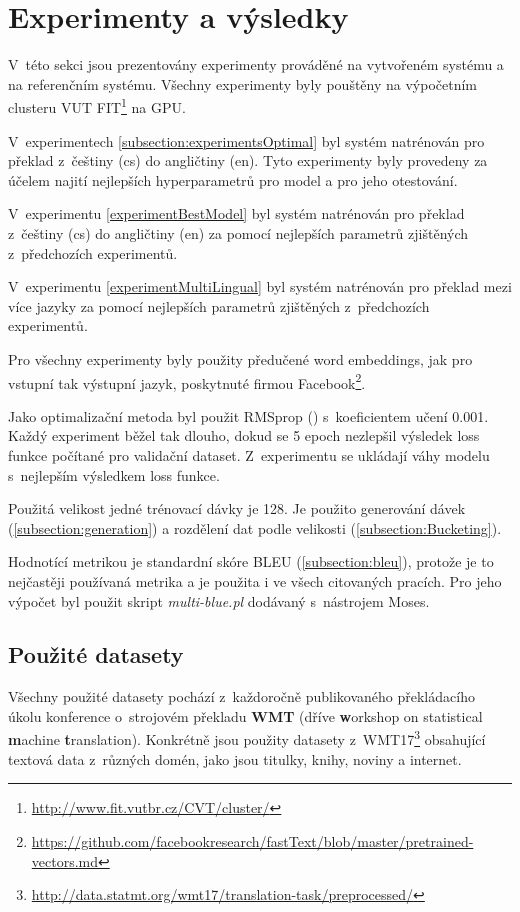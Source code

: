 \chapter{Experimenty a výsledky} \label{chapter:results}
V~této sekci jsou prezentovány experimenty prováděné na vytvořeném systému a na referenčním systému. Všechny experimenty byly pouštěny na výpočetním clusteru VUT FIT\footnote{\url{http://www.fit.vutbr.cz/CVT/cluster/}} na GPU.

V~experimentech \ref{subsection:experimentsOptimal} byl systém natrénován pro překlad z~češtiny (cs) do angličtiny (en). Tyto experimenty byly provedeny za účelem najití nejlepších hyperparametrů pro model a pro jeho otestování.

V~experimentu \ref{experimentBestModel} byl systém natrénován pro překlad z~češtiny (cs) do angličtiny (en) za pomocí nejlepších parametrů zjištěných z~předchozích experimentů.

V~experimentu \ref{experimentMultiLingual} byl systém natrénován pro překlad mezi více jazyky za pomocí nejlepších parametrů zjištěných z~předchozích experimentů.

Pro všechny experimenty byly použity předučené word embeddings, jak pro vstupní tak výstupní jazyk, poskytnuté firmou Facebook\footnote{\url{https://github.com/facebookresearch/fastText/blob/master/pretrained-vectors.md}}.

Jako optimalizační metoda byl použit RMSprop (\cite{gradientDescent}) s~koeficientem učení 0.001. Každý experiment běžel tak dlouho, dokud se 5 epoch nezlepšil výsledek loss funkce počítané pro validační dataset. Z~experimentu se ukládají váhy modelu s~nejlepším výsledkem loss funkce.

Použitá velikost jedné trénovací dávky je 128. Je použito generování dávek (\ref{subsection:generation}) a rozdělení dat podle velikosti (\ref{subsection:Bucketing}).

Hodnotící metrikou je standardní skóre BLEU (\ref{subsection:bleu}), protože je to nejčastěji používaná metrika a je použita i ve všech citovaných pracích. Pro jeho výpočet byl použit skript \emph{multi-blue.pl} dodávaný s~nástrojem Moses.


\section{Použité datasety}
Všechny použité datasety pochází z~každoročně publikovaného překládacího úkolu konference o~strojovém překladu \textbf{WMT} (dříve \textbf{w}orkshop on statistical \textbf{m}achine \textbf{t}ranslation). Konkrétně jsou použity datasety z~WMT17\footnote{\url{http://data.statmt.org/wmt17/translation-task/preprocessed/}} obsahující textová data z~různých domén, jako jsou titulky, knihy, noviny a internet.

